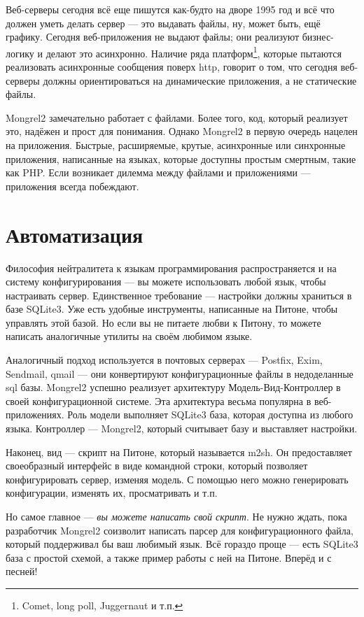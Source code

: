 Веб-серверы сегодня всё еще пишутся как-будто на дворе 1995 год и всё что должен уметь
делать сервер --- это выдавать файлы, ну, может быть, ещё графику. Сегодня веб-приложения
не выдают файлы; они реализуют бизнес-логику и делают это асинхронно. Наличие ряда
платформ\footnote{Comet, long poll, Juggernaut и т.п.}, которые пытаются реализовать
асинхронные сообщения поверх http, говорит о том,
что сегодня веб-серверы должны ориентироваться на динамические приложения, а не
статические файлы.

Mongrel2 замечательно работает с файлами. Более того, код, который реализует это,
надёжен и прост для понимания. Однако Mongrel2 в первую очередь нацелен на приложения.
Быстрые, расширяемые, крутые, асинхронные или синхронные приложения, написанные на
языках, которые доступны простым смертным, такие как PHP. Если возникает дилемма
между файлами и приложениями --- приложения всегда побеждают.

\section{Автоматизация}

Философия нейтралитета к языкам программирования распространяется и на систему
конфигурирования --- вы можете использовать любой язык, чтобы настраивать сервер.
Единственное требование --- настройки должны храниться в базе SQLite3. Уже есть
удобные инструменты, написанные на Питоне, чтобы управлять этой базой. Но если
вы не питаете любви к Питону, то можете написать аналогичные утилиты на своём
любимом языке.

Аналогичный подход используется в почтовых серверах --- Postfix, Exim, Sendmail, qmail ---
они конвертируют конфигурационные файлы в недоделанные sql базы.
Mongrel2 успешно реализует архитектуру Модель-Вид-Контроллер в своей конфигурационной
системе. Эта архитектура весьма популярна в веб-приложениях. Роль модели выполняет
SQLite3 база, которая доступна из любого языка. Контроллер --- Mongrel2,
который считывает базу и выставляет настройки.

Наконец, вид --- скрипт на Питоне, который называется m2sh. Он предоставляет
своеобразный интерфейс в виде командной строки, который позволяет конфигурировать
сервер, изменяя модель. С помощью него можно генерировать конфигурации, изменять
их, просматривать и т.п.

Но самое главное --- \emph{вы можете написать свой скрипт}. Не нужно ждать, пока
разработчик Mongrel2 соизволит написать парсер для конфигурационного файла,
который поддерживал бы ваш любимый язык. Всё гораздо проще --- есть SQLite3 база
с простой схемой, а также пример работы с ней на Питоне. Вперёд и с песней!

